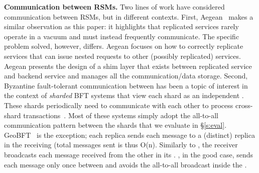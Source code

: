 \par \textbf{Communication between RSMs.} Two lines of work have considered communication between RSMs, but in different contexts. First, Aegean~\cite{aegean} makes a similar observation as this paper: it highlights that replicated services rarely operate in a vacuum and must instead frequently communicate. The specific problem solved, however, differs. Aegean focuses on how to correctly replicate services that can issue nested requests to other (possibly replicated) services. Aegean presents the design of a shim layer that exists between replicated service and backend service and manages all the communication/data storage. Second, Byzantine fault-tolerant communication between  has been a topic of interest in the context of \textit{sharded} BFT systems that view each shard as an independent \RSM{}. These shards periodically need to communicate with each other to process cross-shard transactions~\cite{ahl,sharper,ringbft,rapidchain,basil,conflux,blockvsdist,txallo,byshard}.
Most of these systems simply adopt the all-to-all communication pattern between the shards that we evaluate in \S\ref{s:eval}. 
GeoBFT~\cite{geobft,cluster-sending} is the exception; each replica sends each message to a (distinct) replica in the receiving \RSM{} (total messages sent is thus O(n). 
Similarly to \Scrooge{}, the receiver broadcasts each message received from the other \RSM{} in its \RSM{}.
\Scrooge{}, in the good case, sends each message only once between  and avoids the all-to-all broadcast inside the \RSM{}.



